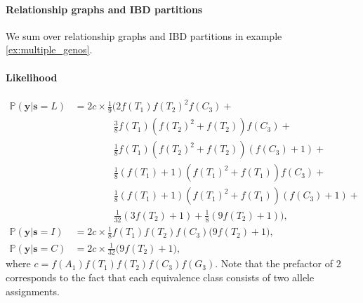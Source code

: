 \paragraph{Relationship graphs and IBD partitions} We sum over relationship graphs and IBD partitions in example \ref{ex:multiple_genos}. 

\paragraph{Likelihood}
%
\begin{align*}
\mathbb{P}(\bm{y}|\bm{s} = L) &= 
2c \times 
    \tfrac{1}{9}\Big(
    2f(T_1)f(T_2)^2f(C_3) + \\
    &\qquad \qquad \tfrac{3}{8}f(T_1)(f(T_2)^2 + f(T_2))f(C_3) + \\
    &\qquad \qquad \tfrac{1}{8}f(T_1)(f(T_2)^2 + f(T_2))(f(C_3) + 1) +  \\
    &\qquad \qquad \tfrac{1}{8}(f(T_1) + 1)(f(T_1)^2 + f(T_1))f(C_3) +  \\
    &\qquad \qquad \tfrac{1}{8}(f(T_1) + 1)(f(T_1)^2 + f(T_1))(f(C_3)+ 1) + \\
    &\qquad \qquad \tfrac{1}{32}(3f(T_2) + 1) + \tfrac{1}{8}(9f(T_2) + 1)
    \Big),\\
    \mathbb{P}(\bm{y}|\bm{s} = I) &=
    2c \times \tfrac{1}{8}f(T_1)f(T_2)f(C_3)\Big(9f(T_2) + 1\Big),\\    
    \mathbb{P}(\bm{y}|\bm{s} = C) &=
    2c \times \tfrac{1}{32}\Big(9f(T_2) + 1\Big),
\end{align*}
\normalsize
where $c = f(A_1)f(T_1)f(T_2)f(C_3)f(G_3)$. Note that the prefactor of $2$ corresponds to the fact that each equivalence class consists of two allele assignments. \\ 

